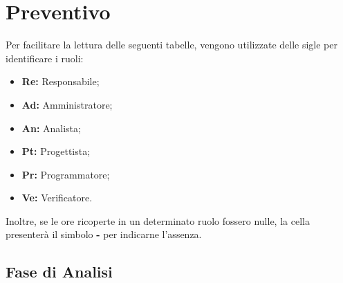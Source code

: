 \section{Preventivo}
Per facilitare la lettura delle seguenti tabelle, vengono utilizzate delle sigle 
per identificare i ruoli:
\begin{itemize}
\item \textbf{Re:} Responsabile;
\item \textbf{Ad:} Amministratore;
\item \textbf{An:} Analista;
\item \textbf{Pt:} Progettista;
\item \textbf{Pr:} Programmatore;
\item \textbf{Ve:} Verificatore.
\end{itemize}
\noindent
Inoltre, se le ore ricoperte in un determinato ruolo fossero nulle, la cella 
presenterà il simbolo \textbf{-} per indicarne l'assenza. 

\subsection{Fase di Analisi}
